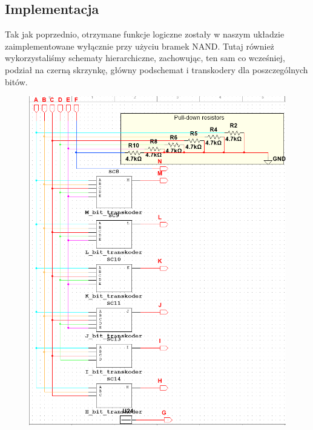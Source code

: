 \documentclass[a4paper]{article}
\begin{document}
\subsection{Implementacja}
Tak jak poprzednio, otrzymane funkcje logiczne zostały w naszym układzie zaimplementowane wyłącznie przy użyciu bramek NAND.
  Tutaj również wykorzystaliśmy schematy hierarchiczne, zachowując, ten sam co wcześniej, podział na czerną skrzynkę, główny podschemat i transkodery dla poszczególnych bitów.
\begin{figure}[H]
  \centering
  \includegraphics[width=\textwidth]{enkoder_bcd.png}
  \label{Podschemat najwyższego rzędu, gromadzący w sobie podschematy właściwych funkcji logicznych}
\end{figure}
\end{document}
